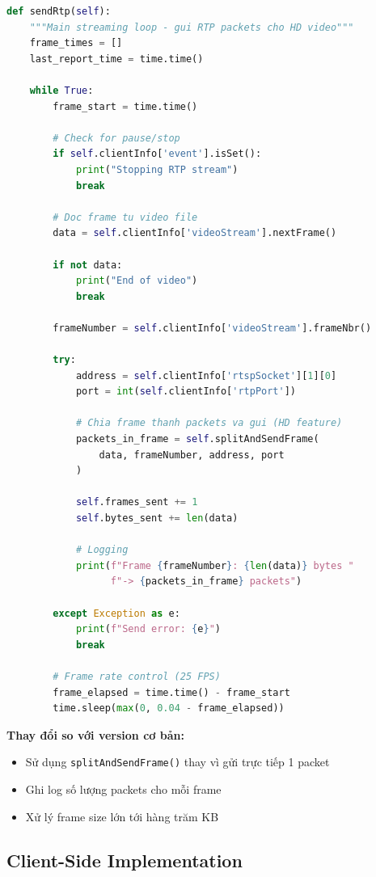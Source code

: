 \documentclass[a4paper,12pt]{article}
\begin{document}
\begin{lstlisting}[language=Python, caption={HD Streaming Loop}]
def sendRtp(self):
    """Main streaming loop - gui RTP packets cho HD video"""
    frame_times = []
    last_report_time = time.time()
    
    while True:
        frame_start = time.time()
        
        # Check for pause/stop
        if self.clientInfo['event'].isSet():
            print("Stopping RTP stream")
            break
        
        # Doc frame tu video file
        data = self.clientInfo['videoStream'].nextFrame()
        
        if not data:
            print("End of video")
            break
        
        frameNumber = self.clientInfo['videoStream'].frameNbr()
        
        try:
            address = self.clientInfo['rtspSocket'][1][0]
            port = int(self.clientInfo['rtpPort'])
            
            # Chia frame thanh packets va gui (HD feature)
            packets_in_frame = self.splitAndSendFrame(
                data, frameNumber, address, port
            )
            
            self.frames_sent += 1
            self.bytes_sent += len(data)
            
            # Logging
            print(f"Frame {frameNumber}: {len(data)} bytes "
                  f"-> {packets_in_frame} packets")
            
        except Exception as e:
            print(f"Send error: {e}")
            break
        
        # Frame rate control (25 FPS)
        frame_elapsed = time.time() - frame_start
        time.sleep(max(0, 0.04 - frame_elapsed))
\end{lstlisting}

\textbf{Thay đổi so với version cơ bản:}
\begin{itemize}
    \item Sử dụng \texttt{splitAndSendFrame()} thay vì gửi trực tiếp 1 packet
    \item Ghi log số lượng packets cho mỗi frame
    \item Xử lý frame size lớn tới hàng trăm KB
\end{itemize}

\subsection{Client-Side Implementation}
\end{document}
